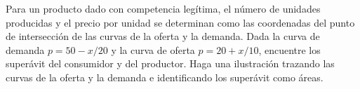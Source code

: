 \item Para un producto dado con competencia legítima, el número de unidades producidas y el precio por unidad se determinan como las coordenadas del punto de intersección de las curvas de la oferta y la demanda. Dada la curva de demanda $p = 50 - x/20$ y la curva de oferta $p = 20 + x/10$, encuentre los superávit del consumidor y del productor. Haga una ilustración trazando las curvas de la oferta y la demanda e identificando los superávit como áreas.
